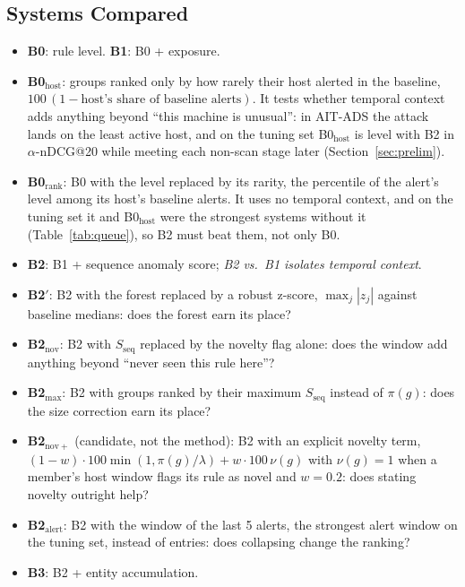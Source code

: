 \documentclass[conference]{IEEEtran}
\begin{document}
\subsection{Systems Compared}

\begin{itemize}
\item \textbf{B0}: rule level. \textbf{B1}: B0 + exposure.
\item \textbf{B0$_\mathrm{host}$}: groups ranked only by how rarely their host alerted in the baseline, $100\,(1 - \text{host's share of baseline alerts})$. It tests whether temporal context adds anything beyond ``this machine is unusual'': in AIT-ADS the attack lands on the least active host, and on the tuning set B0$_\mathrm{host}$ is level with B2 in $\alpha$-nDCG@20 while meeting each non-scan stage later (Section~\ref{sec:prelim}).
\item \textbf{B0$_\mathrm{rank}$}: B0 with the level replaced by its rarity, the percentile of the alert's level among its host's baseline alerts. It uses no temporal context, and on the tuning set it and B0$_\mathrm{host}$ were the strongest systems without it (Table~\ref{tab:queue}), so B2 must beat them, not only B0.
\item \textbf{B2}: B1 + sequence anomaly score; \emph{B2 vs.\ B1 isolates temporal context}.
\item \textbf{B2$'$}: B2 with the forest replaced by a robust z-score, $\max_j |z_j|$ against baseline medians: does the forest earn its place?
\item \textbf{B2$_\mathrm{nov}$}: B2 with $S_\mathrm{seq}$ replaced by the novelty flag alone: does the window add anything beyond ``never seen this rule here''?
\item \textbf{B2$_\mathrm{max}$}: B2 with groups ranked by their maximum $S_\mathrm{seq}$ instead of $\pi(g)$: does the size correction earn its place?
\item \textbf{B2$_\mathrm{nov+}$} (candidate, not the method): B2 with an explicit novelty term, $(1-w)\cdot 100\min(1,\pi(g)/\lambda) + w \cdot 100\,\nu(g)$ with $\nu(g) = 1$ when a member's host window flags its rule as novel and $w = 0.2$: does stating novelty outright help?
\item \textbf{B2$_\mathrm{alert}$}: B2 with the window of the last 5 alerts, the strongest alert window on the tuning set, instead of entries: does collapsing change the ranking?
\item \textbf{B3}: B2 + entity accumulation.
\end{itemize}
\end{document}
